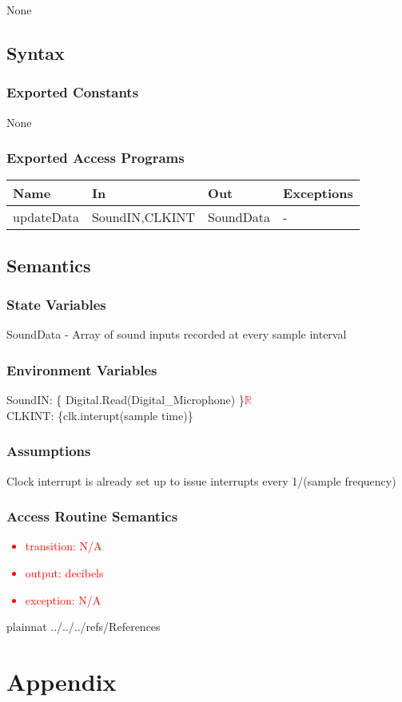 \documentclass[12pt, titlepage]{article}
\begin{document}
None

\subsection{Syntax}

\subsubsection{Exported Constants}

None 

\subsubsection{Exported Access Programs}

\begin{center}
\begin{tabular}{p{2cm} p{4cm} p{4cm} p{2cm}}
\hline
\textbf{Name} & \textbf{In} & \textbf{Out} & \textbf{Exceptions} \\
\hline
updateData & SoundIN,CLKINT & SoundData & - \\
\hline
\end{tabular}
\end{center}

\subsection{Semantics}

\subsubsection{State Variables}

SoundData - Array of sound inputs recorded at every sample interval

\subsubsection{Environment Variables}

SoundIN: \{ Digital.Read(Digital\_Microphone) \}\textcolor{red}{$\mathbb{R}$}\\
CLKINT: \{clk.interupt(sample time)\}

\subsubsection{Assumptions}

Clock interrupt is already set up to issue interrupts every 1/(sample frequency) 

\subsubsection{Access Routine Semantics}
\textcolor{red}{
\begin{itemize}
\item transition: N/A 
\item output: decibels
\item exception: N/A
\end{itemize}
}

\newpage


 {plainnat}
 {../../../refs/References}

\section{Appendix} \label{Appendix}
\end{document}
